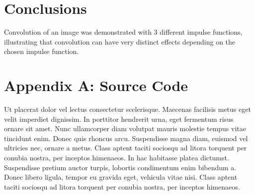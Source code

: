 \documentclass{sydeStyle}
\begin{document}
\section*{Conclusions}
Convolution of an image was demonstrated with 3 different impulse functions,
illustrating that convolution can have very distinct effects depending on the
chosen impulse function.

\section*{Appendix A: Source Code}
Ut placerat dolor vel lectus consectetur scelerisque. Maecenas facilisis
metus eget velit imperdiet dignissim. In porttitor hendrerit urna, eget
fermentum risus ornare sit amet. Nunc ullamcorper diam volutpat mauris
molestie tempus vitae tincidunt enim. Donec quis rhoncus arcu. Suspendisse
magna diam, euismod vel ultricies nec, ornare a metus. Class aptent taciti
sociosqu ad litora torquent per conubia nostra, per inceptos himenaeos. In
hac habitasse platea dictumst. Suspendisse pretium auctor turpis, lobortis
condimentum enim bibendum a. Donec libero ligula, tempor eu gravida eget,
vehicula vitae nisi. Class aptent taciti sociosqu ad litora torquent per
conubia nostra, per inceptos himenaeos.
\end{document}
